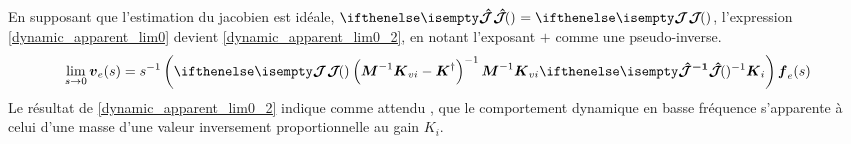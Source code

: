 \documentclass[12pt, a4paper]{article} %
\numberwithin{equation}{section}
\begin{document}
	En supposant que l'estimation du jacobien est idéale, $ \jacobianHat{}{}{} = \jacobian{}{}{} $, l'expression \cref{dynamic_apparent_lim0} devient \cref{dynamic_apparent_lim0_2}, en notant l'exposant $+$ comme une pseudo-inverse.
	\begin{equation} \label{dynamic_apparent_lim0_2}
	 	\lim_{s \to 0} \vect{v}_{e}(s) = s^{-1} \left( \jacobian{}{}{} \left( \matr{M}^{-1} \matr{K}_{vi} - \matr{K}^\dagger \right)^{-1} \matr{M}^{-1} \matr{K}_{vi} \jacobianHat{}{}{-1} \matr{K}_{i} \right) \vect{f}_{e}(s)
	\end{equation}	
	Le résultat de \cref{dynamic_apparent_lim0_2} indique comme attendu \citep{lamy_achieving_2009}, que le comportement dynamique en basse fréquence s'apparente à celui d'une masse d'une valeur inversement proportionnelle au gain $ K_i $.
\end{document}
